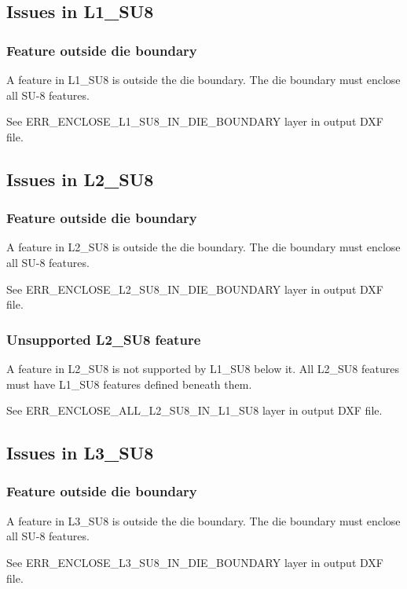 \documentclass[twoside]{article}
\begin{document}
\subsection{Issues in L1\_SU8}

\subsubsection{Feature outside die boundary}
\par A feature in L1\_SU8 is outside the die boundary. The die boundary must
enclose all SU-8 features.  \par See ERR\_ENCLOSE\_L1\_SU8\_IN\_DIE\_BOUNDARY
layer in output DXF file.

\subsection{Issues in L2\_SU8}

\subsubsection{Feature outside die boundary}
\par A feature in L2\_SU8 is outside the die boundary. The die boundary must
enclose all SU-8 features.  \par See ERR\_ENCLOSE\_L2\_SU8\_IN\_DIE\_BOUNDARY
layer in output DXF file.

\subsubsection{Unsupported L2\_SU8 feature}
\par A feature in L2\_SU8 is not supported by L1\_SU8 below it. All L2\_SU8
features must have L1\_SU8 features defined beneath them.  \par See
ERR\_ENCLOSE\_ALL\_L2\_SU8\_IN\_L1\_SU8 layer in output DXF file.

\subsection{Issues in L3\_SU8}

\subsubsection{Feature outside die boundary}
\par A feature in L3\_SU8 is outside the die boundary. The die boundary must
enclose all SU-8 features.  \par See ERR\_ENCLOSE\_L3\_SU8\_IN\_DIE\_BOUNDARY
layer in output DXF file.
\end{document}
